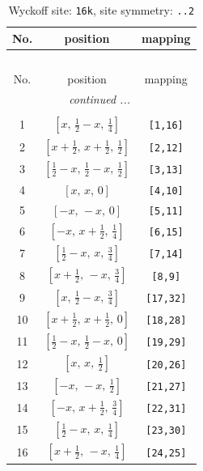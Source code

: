 \documentclass[fleqn,8pt]{jsarticle}
\begin{document}
\renewcommand{\arraystretch}{1.2}
\begin{longtable}{ccc}
\caption{Wyckoff site: {\tt 16k}, site symmetry: {\tt ..2}}
 \\
 \hline \hline
No. & position & mapping \\ \hline \endfirsthead

\multicolumn{2}{l}{\tablename\ \thetable{}} \\
 \hline \hline
No. & position & mapping \\ \hline \endhead

 \hline \hline
\multicolumn{2}{r}{\footnotesize\it continued ...} \\ \endfoot

 \hline \hline
\multicolumn{2}{r}{} \\ \endlastfoot

1 & $\left[ x,\, \frac{1}{2} - x,\, \frac{1}{4} \right]$ & {\tt [1,16]} \\ \hline
2 & $\left[ x + \frac{1}{2},\, x + \frac{1}{2},\, \frac{1}{2} \right]$ & {\tt [2,12]} \\ \hline
3 & $\left[ \frac{1}{2} - x,\, \frac{1}{2} - x,\, \frac{1}{2} \right]$ & {\tt [3,13]} \\ \hline
4 & $\left[ x,\, x,\, 0 \right]$ & {\tt [4,10]} \\ \hline
5 & $\left[ - x,\, - x,\, 0 \right]$ & {\tt [5,11]} \\ \hline
6 & $\left[ - x,\, x + \frac{1}{2},\, \frac{1}{4} \right]$ & {\tt [6,15]} \\ \hline
7 & $\left[ \frac{1}{2} - x,\, x,\, \frac{3}{4} \right]$ & {\tt [7,14]} \\ \hline
8 & $\left[ x + \frac{1}{2},\, - x,\, \frac{3}{4} \right]$ & {\tt [8,9]} \\ \hline
9 & $\left[ x,\, \frac{1}{2} - x,\, \frac{3}{4} \right]$ & {\tt [17,32]} \\ \hline
10 & $\left[ x + \frac{1}{2},\, x + \frac{1}{2},\, 0 \right]$ & {\tt [18,28]} \\ \hline
11 & $\left[ \frac{1}{2} - x,\, \frac{1}{2} - x,\, 0 \right]$ & {\tt [19,29]} \\ \hline
12 & $\left[ x,\, x,\, \frac{1}{2} \right]$ & {\tt [20,26]} \\ \hline
13 & $\left[ - x,\, - x,\, \frac{1}{2} \right]$ & {\tt [21,27]} \\ \hline
14 & $\left[ - x,\, x + \frac{1}{2},\, \frac{3}{4} \right]$ & {\tt [22,31]} \\ \hline
15 & $\left[ \frac{1}{2} - x,\, x,\, \frac{1}{4} \right]$ & {\tt [23,30]} \\ \hline
16 & $\left[ x + \frac{1}{2},\, - x,\, \frac{1}{4} \right]$ & {\tt [24,25]} \\
\end{longtable}
\end{document}
